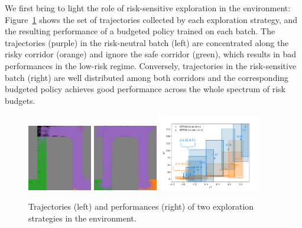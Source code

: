 \documentclass{article}
\begin{document}
We first bring to light the role of risk-sensitive exploration in the  environment: Figure~\ref{fig:exploration} shows the set of trajectories collected by each exploration strategy, and the resulting performance of a budgeted policy trained on each batch. The trajectories (purple) in the risk-neutral batch (left) are concentrated along the risky corridor (orange) and ignore the safe corridor (green), which results in bad performances in the low-risk regime. Conversely, trajectories in the risk-sensitive batch (right) are well distributed among both corridors and the corresponding budgeted policy achieves good performance across the whole spectrum of risk budgets.
\begin{figure}[tp]
    \centering
    \includegraphics[width=0.25\textwidth]{source/img/risk-neutral.png}
    \includegraphics[width=0.25\textwidth]{source/img/risk-sensitive.png}
    \includegraphics[page=1, width=0.4\textwidth]{source/img/corridors}
    \caption{Trajectories (left) and performances (right) of two exploration strategies in the  environment. }
    \label{fig:exploration}
\end{figure}
\end{document}

